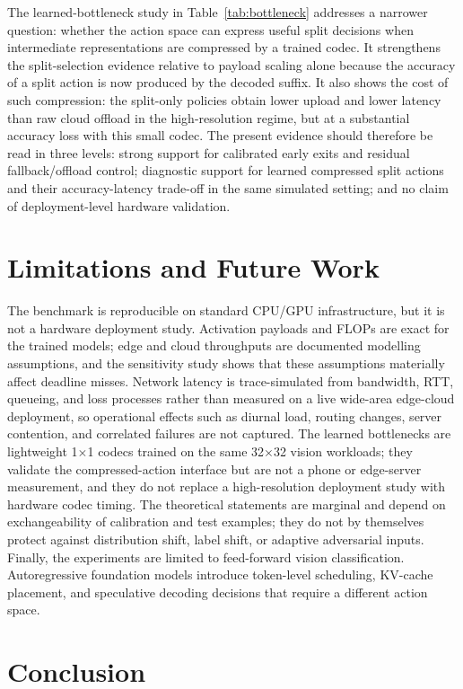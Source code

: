 \documentclass[11pt]{article}
\begin{document}
The learned-bottleneck study in Table~\ref{tab:bottleneck} addresses a narrower
question: whether the action space can express useful split decisions when
intermediate representations are compressed by a trained codec. It strengthens
the split-selection evidence relative to payload scaling alone because the
accuracy of a split action is now produced by the decoded suffix. It also shows
the cost of such compression: the split-only policies obtain lower upload and
lower latency than raw cloud offload in the high-resolution regime, but at a
substantial accuracy loss with this small codec. The present evidence should
therefore be read in three levels: strong support for calibrated early exits and
residual fallback/offload control; diagnostic support for learned compressed
split actions and their accuracy-latency trade-off in the same simulated setting;
and no claim of deployment-level hardware validation.

\section{Limitations and Future Work}

The benchmark is reproducible on standard CPU/GPU infrastructure, but it is not a
hardware deployment study. Activation payloads and FLOPs are exact for the
trained models; edge and cloud throughputs are documented modelling assumptions,
and the sensitivity study shows that these assumptions materially affect
deadline misses. Network latency is trace-simulated from bandwidth, RTT,
queueing, and loss processes rather than measured on a live wide-area edge-cloud
deployment, so operational effects such as diurnal load, routing changes, server
contention, and correlated failures are not captured. The learned bottlenecks
are lightweight 1$\times$1 codecs trained on the same 32$\times$32 vision
workloads; they validate the compressed-action interface but are not a phone or
edge-server measurement, and they do not replace a high-resolution deployment
study with hardware codec timing. The theoretical statements are marginal and
depend on exchangeability of calibration and test examples; they do not by
themselves protect against distribution shift, label shift, or adaptive
adversarial inputs. Finally, the experiments are limited to feed-forward vision
classification.
Autoregressive foundation models introduce token-level scheduling, KV-cache
placement, and speculative decoding decisions that require a different action
space.

\section{Conclusion}
\end{document}
